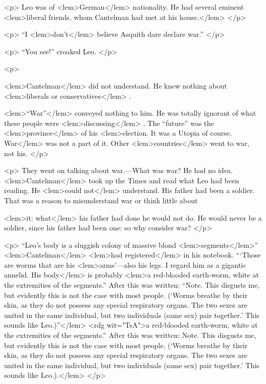 				<p>
					Leo was of 
<lem>German</lem>{} nationality. He had several eminent 
<lem>liberal friends, whom Cantelman had met at his house.</lem>
						{} 
 				</p>

				<p>
					“I 
<lem>don't</lem>{} believe Asquith dare declare war.” 
 				</p>

				<p>
					“You see!” croaked Leo. 
 				</p>

				<p>
					
<lem>Cantelman</lem>{} did not understand. He knew nothing about 
<lem>liberals or conservatives</lem>
						{}. 
					
<lem>“War”</lem>
						{} 
					conveyed nothing to him. He was totally ignorant of what these people were 
<lem>discussing</lem>
						{}. 
					The “future” was the 
<lem>province</lem>
						{} 
					of his 
<lem>election. It was a Utopia of course. War</lem>
						{} 
					was not a part of 
					it. Other 
<lem>countries</lem>{} went to war, not his. 
 				</p>

				<p>
					They went on talking about war.---What was war? He had no idea.  
<lem>Cantelman</lem>
						{} 
					took up 
					the Times and read what Leo had been reading. He 
<lem>could not</lem>
						{} 
					understand. His father 
					had been a soldier. That was a reason to misunderstand war or think little about 
					
<lem>it: what</lem>
						{} 
					his father had done he would not do. He would never be a soldier, since his 
					father had been one: so why consider war? 
 				</p>

				<p>
					“Leo's body is a sluggish colony of massive blond 
<lem>segments</lem>{}” 
<lem>Cantelman</lem>{} 
<lem>had registered</lem>
						{} 
					in his notebook.  “`Those are worms that are his 
<lem>arms'---also his legs. I regard him as a gigantic annelid. His body</lem>
						{} 
					is probably  
<lem>a red-blooded earth-worm, white at the extremities of the segments.”  After this was written: 
“Note. This disgusts me, but evidently this is not the case with most people. 
					(`Worms breathe by their skin, as they do not possess any special respiratory organs. The two sexes are united in 
					the same individual, but two individuals (same sex) pair together.' This sounds like 
Leo.)”</lem>
<rdg wit="TsA">a red-blooded earth-worm, white at the extremities of the segments.”  After this was written: 
Note. This disgusts me, but evidently this is not the case with most people. 
					(`Worms breathe by their skin, as they do not possess any special respiratory organs. The two sexes are united in 
					the same individual, but two individuals (same sex) pair together.' This sounds like 
Leo.).</lem>
						{} 
 				</p>

